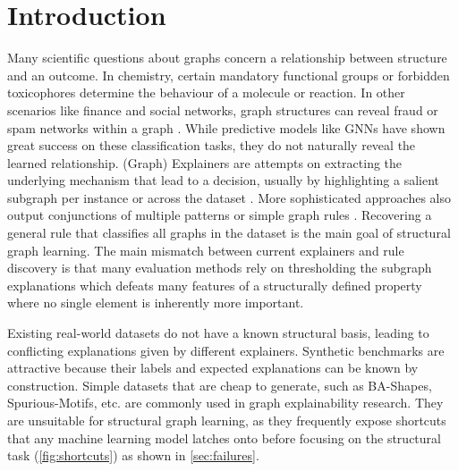 \documentclass[11pt,twocolumn]{article}
\begin{document}
\section{Introduction} \label{sec:intro}
Many scientific questions about graphs concern a relationship between structure and an outcome.
In chemistry, certain mandatory functional groups or forbidden toxicophores determine the behaviour of a molecule or reaction. In other scenarios like finance and social networks, graph structures can reveal fraud or spam networks within a graph \cite{TODO}.
While predictive models like GNNs have shown great success on these classification tasks, they do not naturally reveal the learned relationship.
(Graph) Explainers are attempts on extracting the underlying mechanism that lead to a decision, usually by highlighting a salient subgraph per instance \cite{yingGNNExplainerGeneratingExplanations2019, luoParameterizedExplainerGraph2020, yuanExplainabilityGraphNeural2021} or across the dataset \cite{yuanXGNNModelLevelExplanations2020, yuanExplainabilityGraphNeural2023}. More sophisticated approaches also output conjunctions of multiple patterns or simple graph rules \cite{azzolinGlobalExplainabilityGNNs2023, ragnoLogicbasedSelfExplainableGraph2025, armgaanGRAPHTRAILTranslatingGNN, mullerGraphChefLearningRecipe}.
Recovering a general rule that classifies all graphs in the dataset is the main goal of structural graph learning.
The main mismatch between current explainers and rule discovery is that many evaluation methods rely on thresholding the subgraph explanations which defeats many features of a structurally defined property where no single element is inherently more important. \cite{proszewskaBXAICDatasetBenchmarking2025}



Existing real-world datasets do not have a known structural basis, leading to conflicting explanations given by different explainers.
Synthetic benchmarks are attractive because their labels and expected explanations can be known by construction.
Simple datasets that are cheap to generate, such as BA-Shapes, Spurious-Motifs, etc. are commonly used in graph explainability research.
They are unsuitable for structural graph learning, as they frequently expose shortcuts that any machine learning model latches onto before focusing on the structural task (\ref{fig:shortcuts}) as shown in \cref{sec:failures}.
\end{document}
